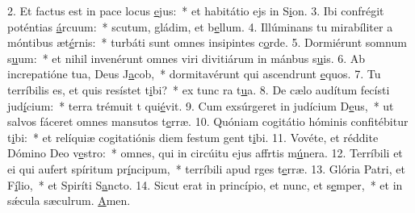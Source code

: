 2. Et factus est in pace locus \uline{e}jus:~* et habitátio ejs in S\uline{i}on.
3. Ibi confrégit poténtias \uline{á}rcuum:~* scutum, gládim, et b\uline{e}llum.
4. Illúminans tu mirabíliter a móntibus æt\uline{é}rnis:~* turbáti sunt omnes insipintes c\uline{o}rde.
5. Dormiérunt somnum s\uline{u}um:~* et nihil invenérunt omnes viri divitiárum in mánbus s\uline{u}is.
6. Ab increpatióne tua, Deus J\uline{a}cob,~* dormitavérunt qui ascendrunt \uline{e}quos.
7. Tu terríbilis es, et quis resístet t\uline{i}bi?~* ex tunc ra t\uline{u}a.
8. De cælo audítum fecísti jud\uline{í}cium:~* terra trémuit t qui\uline{é}vit.
9. Cum exsúrgeret in judícium D\uline{e}us,~* ut salvos fáceret omnes mansutos t\uline{e}rræ.
10. Quóniam cogitátio hóminis confitébitur t\uline{i}bi:~* et relíquiæ cogitatiónis diem festum gent t\uline{i}bi.
11. Vovéte, et réddite Dómino Deo v\uline{e}stro:~* omnes, qui in circúitu ejus affrtis m\uline{ú}nera.
12. Terríbili et ei qui aufert spíritum pr\uline{í}ncipum,~* terríbili apud rges t\uline{e}rræ.
13. Glória Patri, et F\uline{í}lio,~* et Spiríti S\uline{a}ncto.
14. Sicut erat in princípio, et nunc, et s\uline{e}mper,~* et in sǽcula sæculrum. \uline{A}men.
